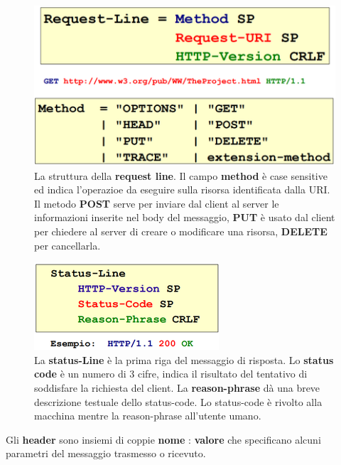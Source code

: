 \documentclass[11pt,a4paper]{article}
\theoremstyle{definition}
\begin{document}
\begin{figure}[!h]
	\includegraphics[scale=0.3]{Immagini/Req_line.png}
	\centering
	\caption{La struttura della \textbf{request line}. Il campo \textbf{method} è case sensitive ed indica l'operazioe da eseguire sulla risorsa identificata dalla URI. Il metodo \textbf{POST} serve per inviare dal client al server le
		informazioni inserite nel body del messaggio, \textbf{PUT} è usato dal client per chiedere al server di creare o modificare una risorsa, \textbf{DELETE} per cancellarla.}
\end{figure}
\begin{figure}[!h]
	\includegraphics[scale=0.4]{Immagini/Stat_line.png}
	\centering
	\caption{La \textbf{status-Line} è la prima riga del messaggio di risposta. Lo \textbf{status code} è un numero di 3 cifre, indica il risultato del tentativo di soddisfare la richiesta del client. La \textbf{reason-phrase} dà una breve descrizione testuale dello status-code. Lo status-code è rivolto alla macchina mentre la reason-phrase all'utente umano.}
\end{figure}
Gli \textbf{header} sono insiemi di coppie \textbf{nome} : \textbf{valore} che specificano
alcuni parametri del messaggio trasmesso o ricevuto.
\end{document}
